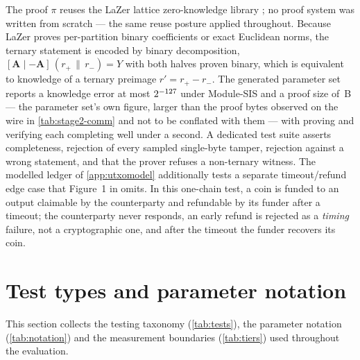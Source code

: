 The proof $\pi$ reuses the LaZer lattice zero-knowledge library \cite{lazer}; no proof system was written from scratch --- the same reuse posture applied throughout.
Because LaZer proves per-partition binary coefficients or exact Euclidean norms, the
ternary statement is encoded by binary decomposition,
$[\mathbf{A} \mid -\mathbf{A}]\,(r_{+}\,\|\,r_{-}) = Y$ with both halves proven binary,
which is equivalent to knowledge of a ternary preimage $r' = r_{+} - r_{-}$. The
generated parameter set reports a knowledge error at most $2^{-127}$ under
Module-SIS and a proof size of \piProofBytes\,B --- the parameter set's own figure, larger
than the proof bytes observed on the wire in \cref{tab:stage2-comm} and not to be
conflated with them --- with proving and verifying each completing
well under a second. A dedicated test suite asserts completeness, rejection of every
sampled single-byte tamper, rejection against a wrong statement, and that the prover
refuses a non-ternary witness. The modelled ledger of \cref{app:utxomodel} additionally
tests a separate timeout/refund edge case that Figure~1 in \cite{esgin2020post} omits. In
this one-chain test, a coin is funded to an output claimable by the counterparty and
refundable by its funder after a timeout; the counterparty never responds, an early
refund is rejected as a \emph{timing} failure, not a cryptographic one, and after
the timeout the funder recovers its coin.

\section{Test types and parameter notation}
\label{app:tests}

This section collects the testing taxonomy (\cref{tab:tests}), the parameter notation
(\cref{tab:notation}) and the measurement boundaries (\cref{tab:tiers}) used throughout
the evaluation.

